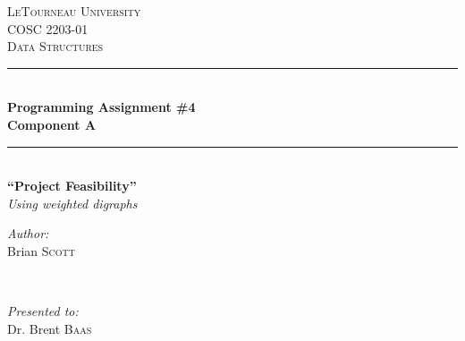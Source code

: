 \begin{titlepage}
\newcommand{\HRule}{\rule{\linewidth}{0.5mm}} %

\center %
 

\textsc{\LARGE LeTourneau University}\\[1.0cm] %
\textsc{\Large COSC 2203-01}\\[0.5cm] %
\textsc{\large Data Structures}\\[0.5cm] %


\HRule \\[0.4cm]
{ \huge \bfseries Programming Assignment \#4\\Component A}\\[0.2cm] %
\HRule \\[1.5cm]
 

{\Large\bfseries ``Project Feasibility''}\\[5mm]
{\Large \emph{Using weighted digraphs}} \\[1.5cm]


\begin{minipage}{0.35\textwidth}
	\begin{flushleft} \large
		\emph{Author:}\\
		Brian \textsc{Scott} %
	\end{flushleft}
\end{minipage}
~
\begin{minipage}{0.35\textwidth}
	\begin{flushright} \large
		\emph{Presented to:} \\
		Dr. Brent \textsc{Baas} %
	\end{flushright}
\end{minipage}\\[4cm]


\end{titlepage}
